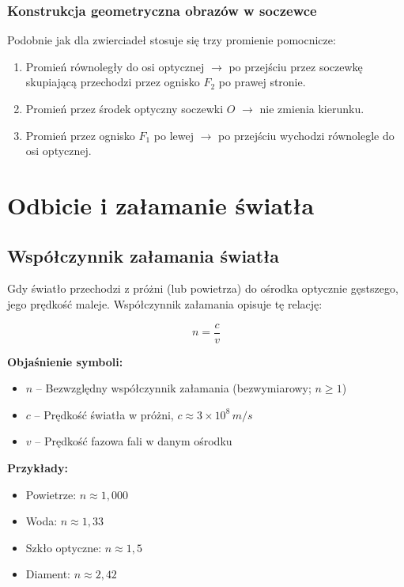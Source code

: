 \documentclass[12pt,a4paper]{article}
\newcommand{\oznaczenie}[2]{%
  \item $#1$ -- #2%
}
\begin{document}
\subsubsection{Konstrukcja geometryczna obrazów w soczewce}

Podobnie jak dla zwierciadeł stosuje się trzy promienie pomocnicze:
\begin{enumerate}
  \item Promień równoległy do osi optycznej $\to$ po przejściu przez soczewkę skupiającą
        przechodzi przez ognisko $F_2$ po prawej stronie.
  \item Promień przez środek optyczny soczewki $O$ $\to$ nie zmienia kierunku.
  \item Promień przez ognisko $F_1$ po lewej $\to$ po przejściu wychodzi
        równolegle do osi optycznej.
\end{enumerate}

\newpage
\section{Odbicie i załamanie światła}

\subsection{Współczynnik załamania światła}

Gdy światło przechodzi z próżni (lub powietrza) do ośrodka optycznie gęstszego,
jego prędkość maleje.  Współczynnik załamania opisuje tę relację:

\begin{wzorbox}
\begin{equation}
  n = \frac{c}{v}
  \label{eq:wspolczynnik_zalamaniia}
\end{equation}
\end{wzorbox}

\begin{objasnbox}
\textbf{Objaśnienie symboli:}
\begin{itemize}[leftmargin=2em]
  \oznaczenie{n}{Bezwzględny współczynnik załamania (bezwymiarowy; $n \geq 1$)}
  \oznaczenie{c}{Prędkość światła w próżni, $c \approx 3\times10^8\,\si{m/s}$}
  \oznaczenie{v}{Prędkość fazowa fali w danym ośrodku \quad [\textbf{m/s}]}
\end{itemize}
\textbf{Przykłady:}
\begin{itemize}
  \item Powietrze: $n \approx 1{,}000$
  \item Woda: $n \approx 1{,}33$
  \item Szkło optyczne: $n \approx 1{,}5$
  \item Diament: $n \approx 2{,}42$
\end{itemize}
\end{objasnbox}
\end{document}
